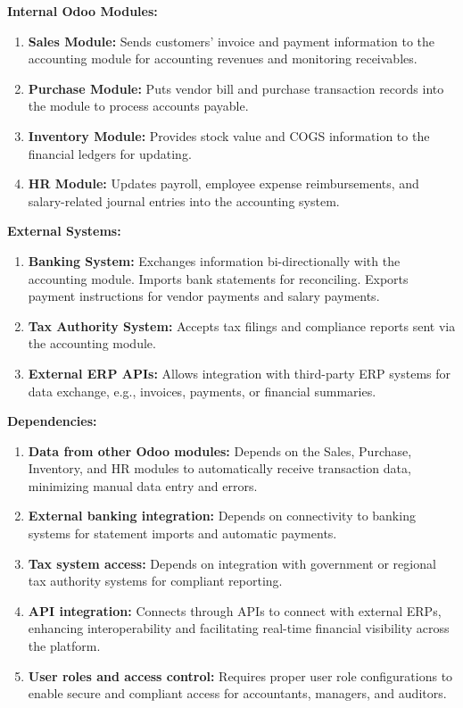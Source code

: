 \documentclass[11pt,a4paper]{article}
\begin{document}
\noindent\textbf{Internal Odoo Modules:}
\begin{enumerate}[label=\roman*.]
    \item \textbf{Sales Module:} Sends customers' invoice and payment information to the accounting module for accounting revenues and monitoring receivables.
    \item \textbf{Purchase Module:} Puts vendor bill and purchase transaction records into the module to process accounts payable.
    \item \textbf{Inventory Module:} Provides stock value and COGS information to the financial ledgers for updating.
    \item \textbf{HR Module:} Updates payroll, employee expense reimbursements, and salary-related journal entries into the accounting system.
\end{enumerate}

\noindent\textbf{External Systems:}
\begin{enumerate}[label=\roman*.]
    \item \textbf{Banking System:} Exchanges information bi-directionally with the accounting module. Imports bank statements for reconciling. Exports payment instructions for vendor payments and salary payments.
    \item \textbf{Tax Authority System:} Accepts tax filings and compliance reports sent via the accounting module.
    \item \textbf{External ERP APIs:} Allows integration with third-party ERP systems for data exchange, e.g., invoices, payments, or financial summaries.
\end{enumerate}

\noindent\textbf{Dependencies:}
\begin{enumerate}[label=\roman*.]
    \item \textbf{Data from other Odoo modules:} Depends on the Sales, Purchase, Inventory, and HR modules to automatically receive transaction data, minimizing manual data entry and errors.
    \item \textbf{External banking integration:} Depends on connectivity to banking systems for statement imports and automatic payments.
    \item \textbf{Tax system access:} Depends on integration with government or regional tax authority systems for compliant reporting.
    \item \textbf{API integration:} Connects through APIs to connect with external ERPs, enhancing interoperability and facilitating real-time financial visibility across the platform.
    \item \textbf{User roles and access control:} Requires proper user role configurations to enable secure and compliant access for accountants, managers, and auditors.
\end{enumerate}
\end{document}
